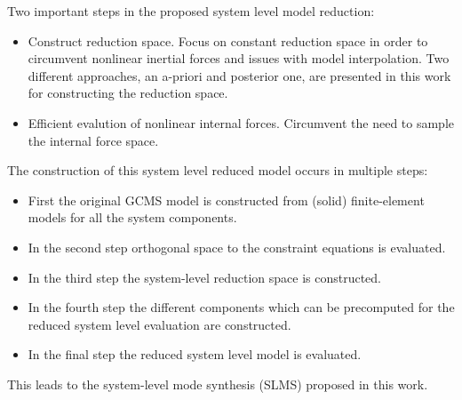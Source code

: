 Two important steps in the proposed system level model reduction:
\begin{itemize}
\item Construct reduction space. Focus on constant reduction space in order to circumvent nonlinear inertial forces and issues with model interpolation. Two different approaches, an a-priori and posterior one, are presented in this work for constructing the reduction space. 
\item Efficient evalution of nonlinear internal forces. Circumvent the need to sample the internal force space. 
\end{itemize}

The construction of this system level reduced model occurs in multiple steps:
\begin{itemize}
\item First the original GCMS model is constructed from (solid) finite-element models for all the system components.
\item In the second step orthogonal space to the constraint equations is evaluated.
\item In the third step the system-level reduction space is constructed.
\item In the fourth step the different components which can be precomputed for the reduced system level evaluation are constructed.
\item In the final step the reduced system level model is evaluated. 
\end{itemize}
This leads to the system-level mode synthesis (SLMS) proposed in this work. 

